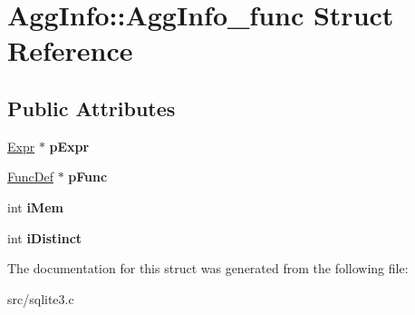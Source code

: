 \hypertarget{struct_agg_info_1_1_agg_info__func}{\section{Agg\-Info\-:\-:Agg\-Info\-\_\-func Struct Reference}
\label{struct_agg_info_1_1_agg_info__func}
}
\subsection*{Public Attributes}
\begin{DoxyCompactItemize}
\item 
\hypertarget{struct_agg_info_1_1_agg_info__func_a7b92e1c42e60d44e28ebf695316f4018}{\hyperlink{struct_expr}{Expr} $\ast$ {\bfseries p\-Expr}}\label{struct_agg_info_1_1_agg_info__func_a7b92e1c42e60d44e28ebf695316f4018}

\item 
\hypertarget{struct_agg_info_1_1_agg_info__func_a840478e8ec53cefa57b50228f6fdafe4}{\hyperlink{struct_func_def}{Func\-Def} $\ast$ {\bfseries p\-Func}}\label{struct_agg_info_1_1_agg_info__func_a840478e8ec53cefa57b50228f6fdafe4}

\item 
\hypertarget{struct_agg_info_1_1_agg_info__func_a41a8da36555c37fffc65f1acead49a4f}{int {\bfseries i\-Mem}}\label{struct_agg_info_1_1_agg_info__func_a41a8da36555c37fffc65f1acead49a4f}

\item 
\hypertarget{struct_agg_info_1_1_agg_info__func_a4a82635b0116eb44ec8ca9e47cc509d9}{int {\bfseries i\-Distinct}}\label{struct_agg_info_1_1_agg_info__func_a4a82635b0116eb44ec8ca9e47cc509d9}

\end{DoxyCompactItemize}


The documentation for this struct was generated from the following file\-:\begin{DoxyCompactItemize}
\item 
src/sqlite3.\-c\end{DoxyCompactItemize}
